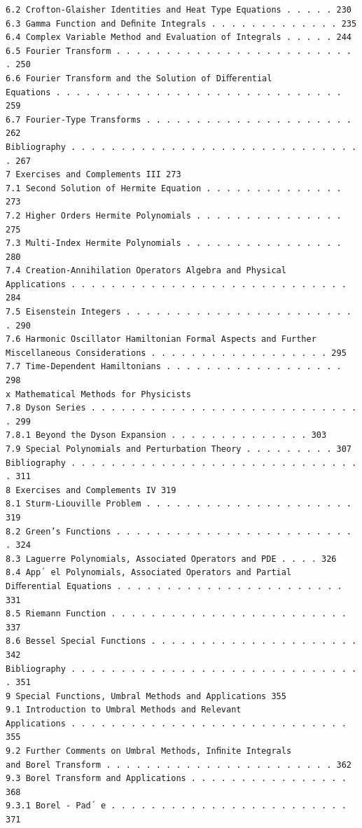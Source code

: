 \begin{verbatim}
6.2 Crofton-Glaisher Identities and Heat Type Equations . . . . . 230
6.3 Gamma Function and Deﬁnite Integrals . . . . . . . . . . . . . 235
6.4 Complex Variable Method and Evaluation of Integrals . . . . . 244
6.5 Fourier Transform . . . . . . . . . . . . . . . . . . . . . . . . . 250
6.6 Fourier Transform and the Solution of Diﬀerential
Equations . . . . . . . . . . . . . . . . . . . . . . . . . . . . . 259
6.7 Fourier-Type Transforms . . . . . . . . . . . . . . . . . . . . . 262
Bibliography . . . . . . . . . . . . . . . . . . . . . . . . . . . . . . 267
7 Exercises and Complements III 273
7.1 Second Solution of Hermite Equation . . . . . . . . . . . . . . 273
7.2 Higher Orders Hermite Polynomials . . . . . . . . . . . . . . . 275
7.3 Multi-Index Hermite Polynomials . . . . . . . . . . . . . . . . 280
7.4 Creation-Annihilation Operators Algebra and Physical
Applications . . . . . . . . . . . . . . . . . . . . . . . . . . . . 284
7.5 Eisenstein Integers . . . . . . . . . . . . . . . . . . . . . . . . 290
7.6 Harmonic Oscillator Hamiltonian Formal Aspects and Further
Miscellaneous Considerations . . . . . . . . . . . . . . . . . . 295
7.7 Time-Dependent Hamiltonians . . . . . . . . . . . . . . . . . . 298
x Mathematical Methods for Physicists
7.8 Dyson Series . . . . . . . . . . . . . . . . . . . . . . . . . . . . 299
7.8.1 Beyond the Dyson Expansion . . . . . . . . . . . . . . 303
7.9 Special Polynomials and Perturbation Theory . . . . . . . . . 307
Bibliography . . . . . . . . . . . . . . . . . . . . . . . . . . . . . . 311
8 Exercises and Complements IV 319
8.1 Sturm-Liouville Problem . . . . . . . . . . . . . . . . . . . . . 319
8.2 Green’s Functions . . . . . . . . . . . . . . . . . . . . . . . . . 324
8.3 Laguerre Polynomials, Associated Operators and PDE . . . . 326
8.4 App´ el Polynomials, Associated Operators and Partial
Diﬀerential Equations . . . . . . . . . . . . . . . . . . . . . . . 331
8.5 Riemann Function . . . . . . . . . . . . . . . . . . . . . . . . 337
8.6 Bessel Special Functions . . . . . . . . . . . . . . . . . . . . . 342
Bibliography . . . . . . . . . . . . . . . . . . . . . . . . . . . . . . 351
9 Special Functions, Umbral Methods and Applications 355
9.1 Introduction to Umbral Methods and Relevant
Applications . . . . . . . . . . . . . . . . . . . . . . . . . . . . 355
9.2 Further Comments on Umbral Methods, Inﬁnite Integrals
and Borel Transform . . . . . . . . . . . . . . . . . . . . . . . 362
9.3 Borel Transform and Applications . . . . . . . . . . . . . . . . 368
9.3.1 Borel - Pad´ e . . . . . . . . . . . . . . . . . . . . . . . . 371

\end{verbatim}
